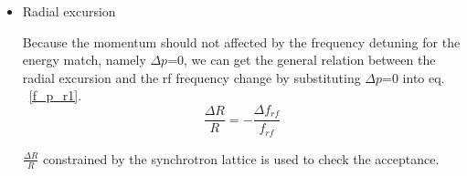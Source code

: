 \begin {itemize}
\item Radial excursion

Because the momentum should not affected by the frequency detuning for the energy match, namely $\Delta p$=0, we can get the general relation between the radial excursion and the rf frequency change by substituting $\Delta p$=0 into eq. ~\ref{f_p_r1}.
\begin{equation}
\frac{\Delta{R}}{R}= - \frac{\Delta f_{\mathit{rf}}}{f_{\mathit{rf}}} 
\label{eq:eq4}
\end{equation}

$\frac{\Delta{R}}{R}$ constrained by the synchrotron lattice is used to check the acceptance.

%
%
%
%
\end {itemize}



